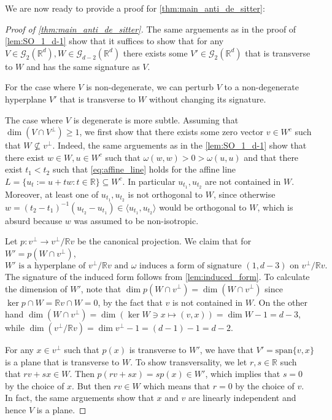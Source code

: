 \documentclass{report}
\begin{document}
We are now ready to provide a proof for \cref{thm:main_anti_de_sitter}:
\begin{proof}[Proof of \cref{thm:main_anti_de_sitter}]
    The same arguements as in the proof of \cref{lem:SO_1_d-1} show that it suffices to show that for any $V \in \mathcal G_2(\mathbb R^d), W \in \mathcal G_{d-2}(\mathbb R^d)$ there exists some $V' \in \mathcal G_2(\mathbb R^d)$ that is transverse to $W$ and has the same signature as $V$.
    
    For the case where $V$ is non-degenerate, we can perturb $V$ to a non-degenerate hyperplane $V'$ that is transverse to $W$ without changing its signature.
    
    The case where $V$ is degenerate is more subtle.
    Assuming that $\dim(V \cap V^\perp) \geq 1$, we first show that there exists some zero vector $v \in W^c$ such that $W \not \subseteq v^\perp$.
    Indeed, the same arguements as in the \cref{lem:SO_1_d-1} show that there exist $w \in W, u \in W^c$ such that $\omega(w,w) > 0 > \omega(u,u)$ and that there exist $t_1 < t_2$ such that 
    \cref{eq:affine_line} holds for the affine line $L = \{ u_t := u + tw : t \in \mathbb R \} \subseteq W^c$.
    In particular $u_{t_1}, u_{t_2}$ are not contained in $W$.
    Moreover, at least one of $u_{t_1}, u_{t_2}$ is not orthogonal to $W$, since otherwise $w = (t_2 - t_1)^{-1}(u_{t_2} - u_{t_1}) \in \langle u_{t_1}, u_{t_2} \rangle$ would be orthogonal to $W$, which is absurd because $w$ was assumed to be non-isotropic. 
    
    Let $p: v^\perp \to v^\perp/\mathbb Rv$ be the canonical projection.
    We claim that for $W' = p(W \cap v^\perp)$,
    \[
    W' \text{ is a hyperplane of } v^\perp/\mathbb Rv \text{ and } \omega \text{ induces a form of signature } (1, d-3) \text{ on } v^\perp/\mathbb Rv.
    \]
    The signature of the induced form follows from \cref{lem:induced_form}.
    To calculate the dimension of $W'$, note that $\dim p(W \cap v^\perp) = \dim(W \cap v^\perp)$ since $\ker p \cap W = \mathbb R v \cap W = 0$, by the fact that $v$ is not contained in $W$.
    On the other hand $\dim (W \cap v^\perp) = \dim(\ker W \ni x \mapsto (v,x)) = \dim W - 1 = d-3$, while $\dim (v^\perp/\mathbb R v) = \dim v^\perp - 1 = (d-1)- 1 = d-2$.

    For any $x \in v^\perp$ such that $p(x)$ is transverse to $W'$, we have that $V' = \mathrm{span}\{v, x \}$ is a plane that is transverse to $W$.
    To show transversality, we let $r, s \in \mathbb R$ such that $r v + s x \in W$.
    Then $p(r v + s x) = s p(x) \in W'$, which implies that $s = 0$ by the choice of $x$.
    But then $r v \in W$ which means that $r = 0$ by the choice of $v$.
    In fact, the same arguements show that $x$ and $v$ are linearly independent and hence $V$ is a plane.


\end{proof}
\end{document}
